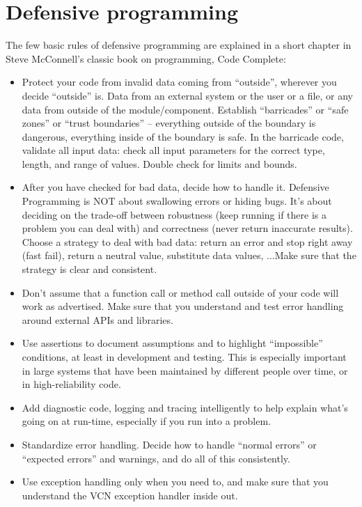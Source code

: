 \documentclass[pdftex,12pt, twocol]{article} %
\begin{document}
\section{Defensive programming}
The few basic rules of defensive programming are explained in a short chapter in Steve McConnell’s classic book on programming, Code Complete:
\begin{itemize}
\item Protect your code from invalid data coming from “outside”, wherever you decide “outside” is. Data from an external system or the user or a file, or any data from outside of the module/component. Establish “barricades” or “safe zones” or “trust boundaries” – everything outside of the boundary is dangerous, everything inside of the boundary is safe. In the barricade code, validate all input data: check all input parameters for the correct type, length, and range of values. Double check for limits and bounds.
\item After you have checked for bad data, decide how to handle it. Defensive Programming is NOT about swallowing errors or hiding bugs. It’s about deciding on the trade-off between robustness (keep running if there is a problem you can deal with) and correctness (never return inaccurate results). Choose a strategy to deal with bad data: return an error and stop right away (fast fail), return a neutral value, substitute data values, ...Make sure that the strategy is clear and consistent.
\item Don’t assume that a function call or method call outside of your code will work as advertised. Make sure that you understand and test error handling around external APIs and libraries.
\item Use assertions to document assumptions and to highlight “impossible” conditions, at least in development and testing. This is especially important in large systems that have been maintained by different people over time, or in high-reliability code.
\item Add diagnostic code, logging and tracing intelligently to help explain what’s going on at run-time, especially if you run into a problem.
\item Standardize error handling. Decide how to handle “normal errors” or “expected errors” and warnings, and do all of this consistently.
\item Use exception handling only when you need to, and make sure that you understand the VCN exception handler inside out.
\end{itemize}
\end{document}
